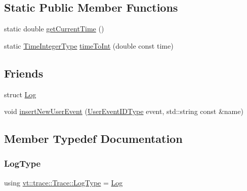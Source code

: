 \subsection*{Static Public Member Functions}
\begin{DoxyCompactItemize}
\item 
static double \hyperlink{structvt_1_1trace_1_1_trace_a04cf6b76b4ced1bc90d246a34c948db5}{get\+Current\+Time} ()
\item 
static \hyperlink{structvt_1_1trace_1_1_trace_ab8db9218a8ab87f59773fcbf81433787}{Time\+Integer\+Type} \hyperlink{structvt_1_1trace_1_1_trace_a0b3d919285d2f0f33cebfb2ecbc9ad00}{time\+To\+Int} (double const time)
\end{DoxyCompactItemize}
\subsection*{Friends}
\begin{DoxyCompactItemize}
\item 
struct \hyperlink{structvt_1_1trace_1_1_trace_add132ae9df1b7ef820c8082c32b0f839}{Log}
\item 
void \hyperlink{structvt_1_1trace_1_1_trace_a17caa1eeb27fd6a4af8786a7f0679d77}{insert\+New\+User\+Event} (\hyperlink{namespacevt_1_1trace_a5908920d051c144c89f17c69ed262350}{User\+Event\+I\+D\+Type} event, std\+::string const \&name)
\end{DoxyCompactItemize}


\subsection{Member Typedef Documentation}
\mbox{\label{structvt_1_1trace_1_1_trace_a43306d96a91e49db081eaea016f1dd0a}} 
\subsubsection{\texorpdfstring{Log\+Type}{LogType}}
{\footnotesize\ttfamily using \hyperlink{structvt_1_1trace_1_1_trace_a43306d96a91e49db081eaea016f1dd0a}{vt\+::trace\+::\+Trace\+::\+Log\+Type} =  \hyperlink{structvt_1_1trace_1_1_log}{Log}}

\mbox{\label{structvt_1_1trace_1_1_trace_ab8db9218a8ab87f59773fcbf81433787}} 
